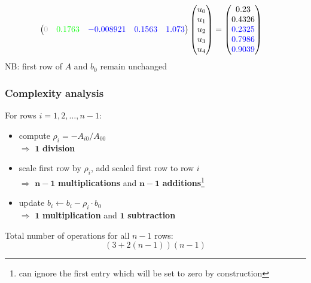 \documentclass{beamer}
\begin{document}
\begin{frame}[fragile]
$${\begin{aligned}
\begin{pmatrix}
\textcolor{lightgray}{0} & \textcolor{green}{0.1763} & \textcolor{blue}{-0.008921} & \textcolor{blue}{0.1563} & \textcolor{blue}{1.073}
\end{pmatrix}
\begin{pmatrix}
u_0 \\ u_1 \\ u_2 \\ u_3 \\ u_4
\end{pmatrix}
    &=  \begin{pmatrix}
0.23\\
\textcolor{black}{0.4326}\\
\textcolor{blue}{0.2325}\\
\textcolor{blue}{0.7986}\\
\textcolor{blue}{0.9039}
\end{pmatrix}
\end{aligned}
}
$$
NB: first row of $A$ and $b_0$ remain unchanged
\end{frame}


\begin{frame}[fragile]
  \frametitle{Complexity analysis}
  For rows $i=1,2,\dots,n-1$:
\begin{itemize}
\item compute $\rho_i = -A_{i0}/A_{00}$\\
{}\qquad $\Rightarrow$ $\boldsymbol{1}$ \textbf{division}
\item scale first row by $\rho_i$, add scaled first row to row $i$\\
{}\qquad $\Rightarrow$  $\boldsymbol{n-1}$ \textbf{multiplications} and $\boldsymbol{n-1}$ \textbf{additions}\footnote{can ignore the first entry which will be set to zero by construction}
\item update $b_i \gets b_i - \rho_i \cdot b_0$\\
{}\qquad $\Rightarrow$ $\boldsymbol{1}$ \textbf{multiplication} and $\boldsymbol{1}$ \textbf{subtraction}
\end{itemize}
Total number of operations for all $n-1$ rows:
$$
(3+2(n-1))(n-1)
$$
\end{frame}

\end{document}
